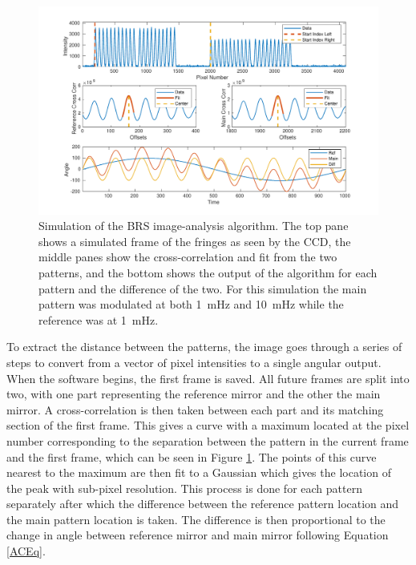 \documentclass [12pt, proquest]{uwthesis}[2019]
\begin{document}
\begin{figure}[!h]
\begin{center}
 \includegraphics[width=\textwidth]{BRS_ImgAnalysis.pdf}
\caption[Simulation of the BRS image analysis algorithm]{Simulation of the BRS image-analysis algorithm. The top pane shows a simulated frame of the fringes as seen by the CCD, the middle panes show the cross-correlation and fit from the two patterns, and the bottom shows the output of the algorithm for each pattern and the difference of the two. For this simulation the main pattern was modulated at both 1~mHz and 10~mHz while the reference was at 1~mHz.}
\label{ImgAnalysis}
\end{center}
\end{figure}

To extract the distance between the patterns, the image goes through a series of steps to convert from a vector of pixel intensities to a single angular output. When the software begins, the first frame is saved. All future frames are split into two, with one part representing the reference mirror and the other the main mirror. A cross-correlation is then taken between each part and its matching section of the first frame. This gives a curve with a maximum located at the pixel number corresponding to the separation between the pattern in the current frame and the first frame, which can be seen in Figure \ref{ImgAnalysis}. The points of this curve nearest to the maximum are then fit to a Gaussian which gives the location of the peak with sub-pixel resolution. This process is done for each pattern separately after which the difference between the reference pattern location and the main pattern location is taken. The difference is then proportional to the change in angle between reference mirror and main mirror following Equation \ref{ACEq}.
\end{document}
